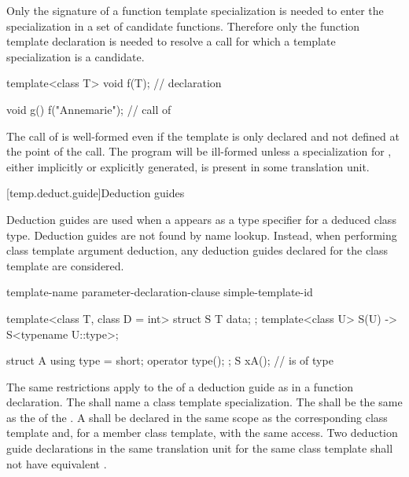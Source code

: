 \pnum
Only the signature of a function template specialization is needed to enter the
specialization in a set of candidate functions.
Therefore only the function template declaration is needed to resolve a call
for which a template specialization is a candidate.
\begin{example}

\begin{codeblock}
template<class T> void f(T);    // declaration

void g() {
  f("Annemarie");               // call of 
}
\end{codeblock}

The call of
is well-formed even if the template
is only declared and not defined at the point of the call.
The program will be ill-formed unless a specialization for
,
either implicitly or explicitly generated,
is present in some translation unit.
\end{example}%

[temp.deduct.guide]{Deduction guides}
%

\pnum
Deduction guides are used
when a  appears
as a type specifier
for a deduced class type.
Deduction guides are not found by name lookup.
Instead, when performing class template argument deduction,
any deduction guides declared for the class template are considered.

\begin{bnf}
\br
     template-name \terminal{(} parameter-declaration-clause \terminal{)} \terminal{->} simple-template-id \terminal{;}
\end{bnf}

\pnum
\begin{example}
\begin{codeblock}
template<class T, class D = int>
struct S {
  T data;
};
template<class U>
S(U) -> S<typename U::type>;

struct A {
  using type = short;
  operator type();
};
S x{A()};           //  is of type 
\end{codeblock}
\end{example}

\pnum
The same restrictions apply
to the 
of a deduction guide
as in a function declaration.
The 
shall name a class template specialization.
The 
shall be the same 
as the 
of the .
A 
shall be declared
in the same scope
as the corresponding class template
and, for a member class template, with the same access.
Two deduction guide declarations
in the same translation unit
for the same class template
shall not have equivalent .

